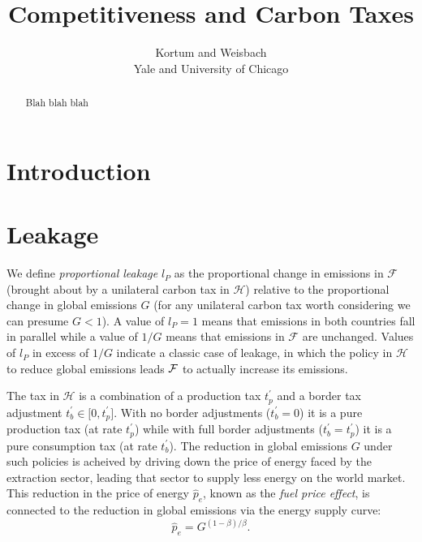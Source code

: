 \documentclass[notitlepage,12pt]{article}
\begin{document}
\title{Competitiveness and Carbon Taxes}
\author{Kortum and Weisbach \\
Yale and University of Chicago}
\maketitle

\begin{abstract}
Blah blah blah
\end{abstract}

\section{Introduction}

\section{Leakage}

We define \emph{proportional leakage} $l_{P}$ as the proportional change in
emissions in $\mathcal{F}$ (brought about by a unilateral carbon tax in $%
\mathcal{H}$) relative to the proportional change in global emissions $G$
(for any unilateral carbon tax worth considering we can presume $G<1$). A
value of $l_{P}=1$ means that emissions in both countries fall in parallel
while a value of $1/G$ means that emissions in $\mathcal{F}$ are unchanged.
Values of $l_{P}$ in excess of $1/G$ indicate a classic case of leakage, in
which the policy in $\mathcal{H}$ to reduce global emissions leads $\mathcal{%
F}$ to actually increase its emissions.

The tax in $\mathcal{H}$ is a combination of a production tax $t_{p}^{\prime
}$ and a border tax adjustment $t_{b}^{\prime }\in \lbrack 0,t_{p}^{\prime }]
$. With no border adjustments ($t_{b}^{\prime }=0$) it is a pure production
tax (at rate $t_{p}^{\prime }$) while with full border adjustments ($%
t_{b}^{\prime }=t_{p}^{\prime }$) it is a pure consumption tax (at rate $%
t_{b}^{\prime }$). The reduction in global emissions $G$ under such policies
is acheived by driving down the price of energy faced by the extraction
sector, leading that sector to supply less energy on the world market. This
reduction in the price of energy $\hat{p}_{e}$, known as the \emph{fuel
price effect}, is connected to the reduction in global emissions via the
energy supply curve:%
\begin{equation*}
\hat{p}_{e}=G^{(1-\beta )/\beta }.
\end{equation*}
\end{document}
